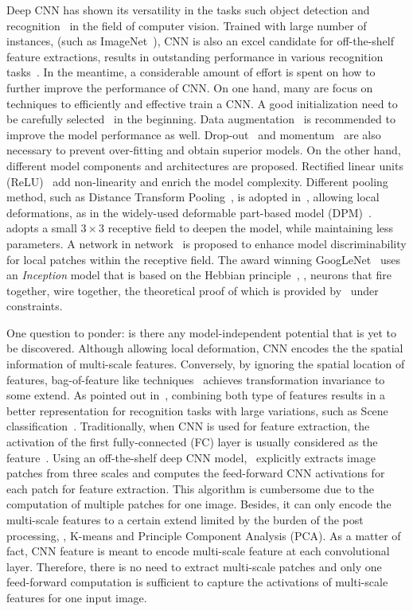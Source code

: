 \documentclass[10pt,twocolumn,letterpaper]{article}
\begin{document}
Deep CNN has shown its versatility in the tasks such object detection and recognition~\cite{AlexNet, overfeat, veryDeep, GoogLeNet, nin} in the field of computer vision. Trained with large number of instances, (such as ImageNet~\cite{ImageNet}), CNN is also an excel candidate for off-the-shelf feature extractions, results in outstanding performance in various recognition tasks~\cite{cnn_baseline}. In the meantime, a considerable amount of effort is spent on how to further improve the performance of CNN. On one hand, many are focus on techniques to efficiently and effective train a CNN. A good initialization need to be carefully selected~\cite{diff_cnn} in the beginning. Data augmentation~\cite{AlexNet} is recommended to improve the model performance as well. Drop-out~\cite{dropout} and momentum~\cite{momentum} are also necessary to prevent over-fitting and obtain superior models. On the other hand, different model components and architectures are proposed. Rectified linear units (ReLU)~\cite{AlexNet} add non-linearity and enrich the model complexity. Different pooling method, such as Distance Transform Pooling~\cite{dist_trans}, is adopted in~\cite{dpm_is_cnn}, allowing local deformations, as in the widely-used deformable part-based model (DPM)~\cite{dpm}. \cite{veryDeep} adopts a small $3\times 3$ receptive field to deepen the model, while maintaining less parameters. A network in network~\cite{nin} is proposed to enhance model discriminability for local patches within the receptive field. The award winning GoogLeNet~\cite{GoogLeNet} uses an \textit{Inception} model that is based on the Hebbian principle~\cite{Hebb}, \ie, neurons that fire together, wire together, the theoretical proof of which is provided by~\cite{dnn_proof} under constraints. 

One question to ponder: is there any model-independent potential that is yet to be discovered. Although allowing local deformation, CNN encodes the the spatial information of multi-scale features. Conversely, by ignoring the spatial location of features, bag-of-feature like techniques~\cite{spatial_pyramid} achieves transformation invariance to some extend. As pointed out in~\cite{Gong14}, combining both type of features results in a better representation for recognition tasks with large variations, such as Scene classification~\cite{SUN397,MIT67}. Traditionally, when CNN is used for feature extraction, the activation of the first fully-connected (FC) layer is usually considered as the feature~\cite{overfeat, Gong14}. Using an off-the-shelf deep CNN model,~\cite{Gong14} explicitly extracts image patches from three scales and computes the feed-forward CNN activations for each patch for feature extraction. This algorithm is cumbersome due to the computation of multiple patches for one image. Besides, it can only encode the multi-scale features to a certain extend limited by the burden of the post processing, \ie, K-means and Principle Component Analysis (PCA). As a matter of fact, CNN feature is meant to encode multi-scale feature at each convolutional layer. Therefore, there is no need to extract multi-scale patches and only one feed-forward computation is sufficient to capture the activations of multi-scale features for one input image. 
\end{document}
